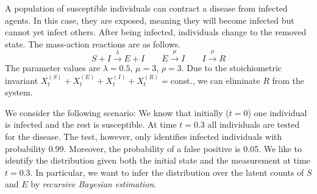 \begin{model}\label{model:seir}
A population of susceptible individuals can contract a disease from infected agents. In this case, they are exposed, meaning they will become infected but cannot yet infect others. After being infected, individuals change to the removed state. The mass-action reactions are as follows.
$$ S + I \xrightarrow{\lambda} E + I \qquad
E \xrightarrow{\mu} I \qquad
I \xrightarrow{\rho} R $$
The parameter values are $\lambda=0.5$, $\mu=3$, $\rho=3$. Due to the stoichiometric invariant $X_t^{(S)} + X_t^{(E)} + X_t^{(I)} + X_t^{(R)} = \mathrm{const.}$, we can eliminate $R$ from the system.
\end{model}

We consider the following scenario:
We know that initially ($t=0$) one individual is infected and the rest is susceptible.
At time $t=0.3$ all individuals are tested for the disease.
The test, however, only identifies infected individuals with probability $0.99$.
Moreover, the probability of a false positive is 0.05.
We like to identify the distribution given both the initial state and the measurement at time $t=0.3$.
In particular, we want to infer the distribution over the latent counts of  $S$ and $E$ by
  \emph{recursive Bayesian estimation}.

